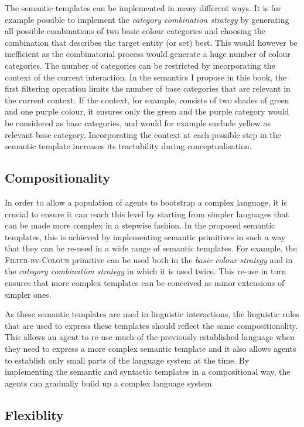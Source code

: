 The semantic templates can be implemented in many different ways. It
is for example possible to implement the \emph{category combination
  strategy} by generating all possible combinations of two basic
colour categories and choosing the combination that describes the
target entity (or set) best. This would however be inefficient as 
the combinatorial process would generate a huge number of colour
categories. The number of categories can be restricted by
incorporating the context of the current interaction. In the semantics
I propose in this book, the first filtering operation limits the
number of base categories that are relevant in the current context. If
the context, for example, consists of two shades of green and one purple
colour, it ensures only the green and the purple category would be
considered as base categories, and would for example exclude yellow as
relevant base category. Incorporating the context at each possible
step in the semantic template increases its tractability during
conceptualisation.

\subsection{Compositionality}

In order to allow a population of agents to bootstrap a complex
language, it is crucial to ensure it can reach this level by starting
from simpler languages that can be made more complex in a stepwise
fashion. In the proposed semantic templates, this is achieved by
implementing semantic primitives in such a way that they can be re-used in a
wide range of semantic templates. For example, the \textsc{Filter-by-Colour}
primitive can be used both in the \emph{basic colour
  strategy} and in the \emph{category combination strategy} in
which it is used twice. This re-use in turn ensures that more complex
templates can be conceived as minor extensions of simpler ones.

As these semantic templates are used in linguistic interactions, the
linguistic rules that are used to express these templates should
reflect the same compositionality. This allows an agent to re-use
much of the previously established language when they need to express
a more complex semantic template and it also allows agents to establish only
small parts of the language system at the time. By implementing the
semantic and syntactic templates in a compositional way, the agents
can gradually build up a complex language system.

\subsection{Flexiblity}

